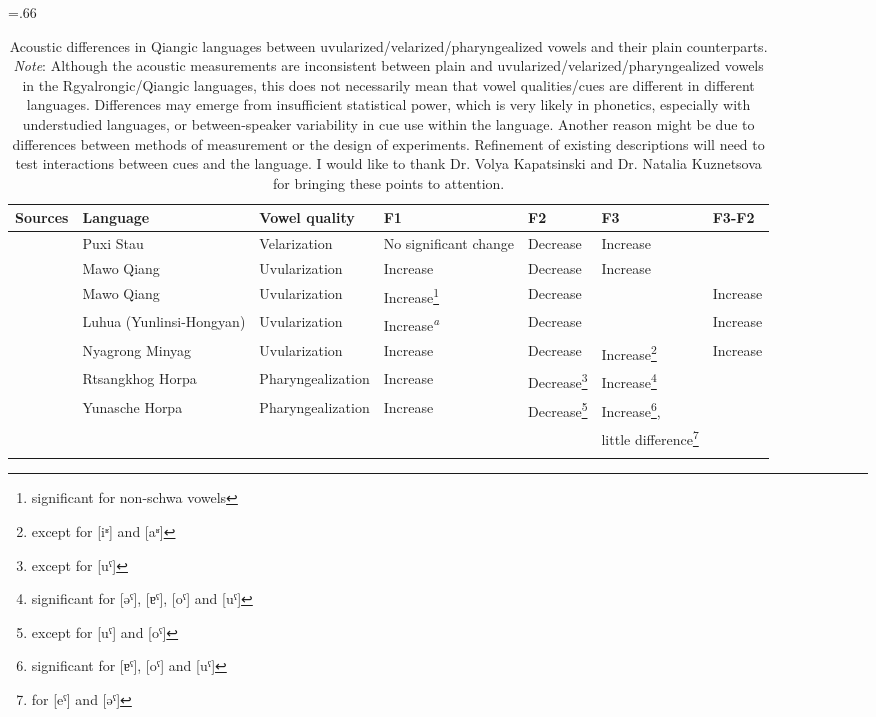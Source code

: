 \documentclass[output=paper]{langscibook}
\begin{document}
\begin{table}
\footnotesize
\caption{Acoustic differences in Qiangic languages between uvularized/velarized/pharyngealized vowels and their plain counterparts. \emph{Note}: Although the acoustic measurements are inconsistent between plain and uvularized/velarized/pharyngealized vowels in the Rgyalrongic/Qiangic languages, this does not necessarily mean that vowel qualities/cues are different in different languages. Differences may emerge from insufficient statistical power, which is very likely in phonetics, especially with understudied languages, or between-speaker variability in cue use within the language. Another reason might be due to differences between methods of measurement or the design of experiments. Refinement of existing descriptions will need to test interactions between cues and the language. I would like to thank Dr. Volya Kapatsinski and Dr. Natalia Kuznetsova for bringing these points to attention.}
\label{tab:guan:11}
\tabcolsep=.66\tabcolsep
\begin{tabular}{lllllll}
\lsptoprule
Sources & {Language} & {Vowel quality} & {F1} & {F2} & {F3} & {F3-F2}\\
\midrule
\citet{LinEtAl2012} & {Puxi Stau} & {Velarization} & {No significant change} & {Decrease} & {Increase} & \\
\citet{SunEvans2013} & {Mawo Qiang} & {Uvularization} & {Increase} & {Decrease} & {Increase} & \\
\citet{EvansEtAl2016} & {Mawo Qiang} & {Uvularization} & Increase\footnote{significant for non-schwa vowels} & {Decrease} &  & {Increase}\\
& Luhua (Yunlinsi-Hongyan) & {Uvularization} & {Increase\textsuperscript{\textit{a}}} & {Decrease} &  & {Increase}\\
\citet{Way2018} & {Nyagrong Minyag} & {Uvularization} & {Increase}  & {Decrease} & {Increase\footnote{except for [iʶ] and [aʶ]}} & {Increase}\\
\citet{ChiuSun2020} & {Rtsangkhog Horpa} & {Pharyngealization} & {Increase} & {Decrease\footnote{except for [uˤ]}} & {Increase\footnote{significant for [əˤ], [ɐˤ], [oˤ] and [uˤ]}} & \\
& Yunasche Horpa & {Pharyngealization} & {Increase} & {Decrease\footnote{except for [uˤ] and [oˤ]}} & Increase\footnote{significant for [ɐˤ], [oˤ] and [uˤ]}, & \\
&                &                     &            &                                               & little difference\footnote{for [eˤ] and [əˤ]} & \\
\lspbottomrule
\end{tabular}
\end{table}
\end{document}
